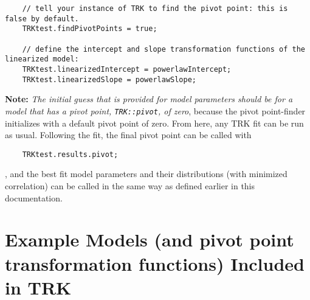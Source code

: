 \documentclass[12pt]{article}
\begin{document}
\begin{lstlisting}
    // tell your instance of TRK to find the pivot point: this is false by default.
    TRKtest.findPivotPoints = true;
    
    // define the intercept and slope transformation functions of the linearized model:
    TRKtest.linearizedIntercept = powerlawIntercept;
    TRKtest.linearizedSlope = powerlawSlope;
\end{lstlisting}

\textbf{Note:} \textit{The initial guess that is provided for model parameters should be for a model that has a pivot point, \texttt{TRK::pivot}, of zero}, because the pivot point-finder initializes with a default pivot point of zero. From here, any TRK fit can be run as usual. Following the fit, the final pivot point can be called with

\begin{lstlisting}
    TRKtest.results.pivot;
\end{lstlisting},
and the best fit model parameters and their distributions (with minimized correlation) can be called in the same way as defined earlier in this documentation.
\section{Example Models (and pivot point transformation functions) Included in TRK}
\end{document}
